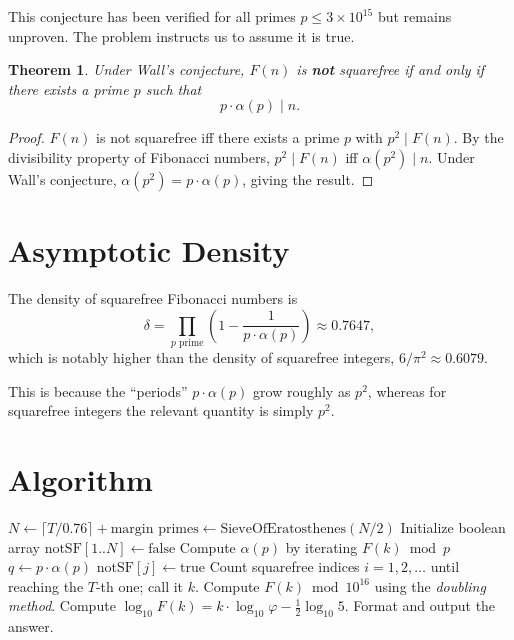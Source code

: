 \documentclass[11pt,a4paper]{article}
\newtheorem{theorem}{Theorem}
\begin{document}
This conjecture has been verified for all primes $p \leq 3 \times 10^{15}$ but remains unproven. The problem instructs us to assume it is true.

\begin{theorem}
Under Wall's conjecture, $F(n)$ is \textbf{not} squarefree if and only if there exists a prime $p$ such that
\[
    p \cdot \alpha(p) \mid n.
\]
\end{theorem}

\begin{proof}
$F(n)$ is not squarefree iff there exists a prime $p$ with $p^2 \mid F(n)$. By the divisibility property of Fibonacci numbers, $p^2 \mid F(n)$ iff $\alpha(p^2) \mid n$. Under Wall's conjecture, $\alpha(p^2) = p \cdot \alpha(p)$, giving the result.
\end{proof}

\section{Asymptotic Density}

The density of squarefree Fibonacci numbers is
\[
    \delta = \prod_{p \text{ prime}} \left(1 - \frac{1}{p \cdot \alpha(p)}\right) \approx 0.7647,
\]
which is notably higher than the density of squarefree integers, $6/\pi^2 \approx 0.6079$.

This is because the ``periods'' $p \cdot \alpha(p)$ grow roughly as $p^2$, whereas for squarefree integers the relevant quantity is simply $p^2$.

\section{Algorithm}

\begin{algorithm}[H]
\caption{Find the $T$-th squarefree Fibonacci number}
\begin{algorithmic}[1]
\State $N \gets \lceil T / 0.76 \rceil + \text{margin}$ 
\State $\text{primes} \gets \text{SieveOfEratosthenes}(N/2)$
\State Initialize boolean array $\text{notSF}[1..N] \gets \text{false}$
    \State Compute $\alpha(p)$ by iterating $F(k) \bmod p$
    \State $q \gets p \cdot \alpha(p)$
            \State $\text{notSF}[j] \gets \text{true}$
        \EndFor
    \EndIf
\EndFor
\State Count squarefree indices $i = 1, 2, \ldots$ until reaching the $T$-th one; call it $k$.
\State Compute $F(k) \bmod 10^{16}$ using the \emph{doubling method}.
\State Compute $\log_{10} F(k) = k \cdot \log_{10}\varphi - \tfrac{1}{2}\log_{10} 5$.
\State Format and output the answer.
\end{algorithmic}
\end{algorithm}
\end{document}
